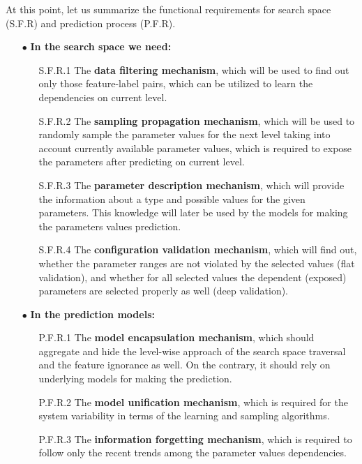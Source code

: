 At this point, let us summarize the functional requirements for search space (S.F.R) and prediction process (P.F.R).
\begin{itemize}
	\item[$\bullet$] \textbf{In the search space we need:}
	\begin{enumerate}
		\item[S.F.R.1] The \textbf{data filtering mechanism}, which will be used to find out only those feature-label pairs, which can be utilized to learn the dependencies on current level.
		
		\item[S.F.R.2] The \textbf{sampling propagation mechanism}, which will be used to randomly sample the parameter values for the next level taking into account currently available parameter values, which is required to expose the parameters after predicting on current level.
		
		\item[S.F.R.3] The \textbf{parameter description mechanism}, which will provide the information about a type and possible values for the given parameters. This knowledge will later be used by the models for making the parameters values prediction.
		
		\item[S.F.R.4] The \textbf{configuration validation mechanism}, which will find out, whether the parameter ranges are not violated by the selected values (flat validation), and whether for all selected values the dependent (exposed) parameters are selected properly as well (deep validation).
	\end{enumerate}

	\item[$\bullet$] \textbf{In the prediction models:}
	\begin{enumerate}
		\item[P.F.R.1] The \textbf{model encapsulation mechanism}, which should aggregate and hide the level-wise approach of the search space traversal and the feature ignorance as well. On the contrary, it should rely on underlying models for making the prediction.
		
		\item[P.F.R.2] The \textbf{model unification mechanism}, which is required for the system variability in terms of the learning and sampling algorithms.
		
		\item[P.F.R.3] The \textbf{information forgetting mechanism}, which is required to follow only the recent trends among the parameter values dependencies.
	\end{enumerate}
\end{itemize}

